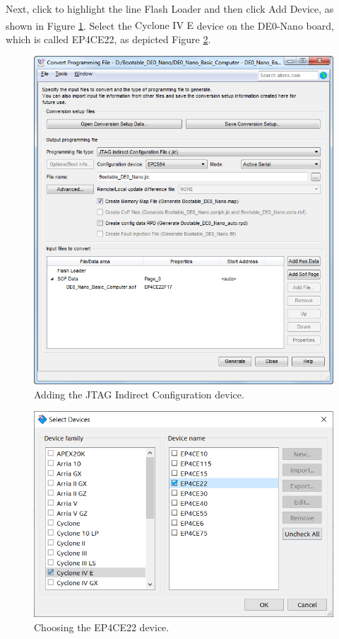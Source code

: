 \documentclass[11pt, twoside, pdftex]{article}
\begin{document}
Next, click to highlight 
the line {\sf Flash Loader} and then click {\sf Add Device}, as shown in Figure \ref{fig:jic3}.
Select the {\sf Cyclone\textsuperscript{\textregistered} IV E} device on the DE0-Nano board, which is called {\sf EP4CE22}, as
depicted Figure \ref{fig:jic4}. 

\begin{figure}[H]
   \begin{center}
        \includegraphics[scale=.5]{figures/jic3.png}
   \end{center}
   \caption{Adding the JTAG Indirect Configuration device.}
	\label{fig:jic3}
\end{figure}

\begin{figure}[H]
   \begin{center}
        \includegraphics[scale=.5]{figures/jic4.png}
   \end{center}
   \caption{Choosing the EP4CE22 device.}
	\label{fig:jic4}
\end{figure}
\end{document}
